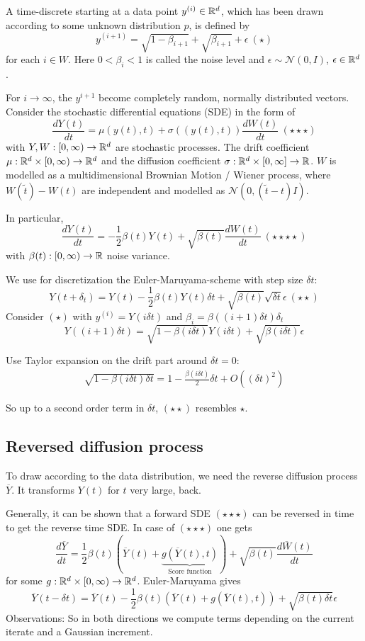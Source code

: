 \begin{definition}\label{def:.29}
    A time-discrete  starting at a data point $y^{(i)}\in\mathbb{R}^d$, which 
    has been drawn according to some unknown distribution $p$, is defined by 
    \[y^{(i+1)}=\sqrt{1-\beta_{i+1}}+\sqrt{\beta_{i+1}}+\epsilon\ (\star)\]
    for each $i\in W$. Here $0<\beta_i<1$ is called the noise level and $\epsilon\sim\mathcal{N}(0,I)$, $\epsilon\in\mathbb{R}^d$.
\end{definition}
For $i\to \infty$, the $y^{i+1}$ become completely random, normally distributed vectors. Consider the stochastic differential equations (SDE) in the 
form of 
\[\frac{d Y(t)}{dt}=\mu(y(t),t)+\sigma((y(t),t))\frac{dW(t)}{dt}\ (\star\star\star)\]
with $Y,W:[0,\infty)\to\mathbb{R}^d$ are stochastic processes. The drift coefficient $\mu:\mathbb{R}^d\times [0,\infty)\to\mathbb{R}^d$ and 
the diffusion coefficient $\sigma:\mathbb{R}^d\times [0,\infty]\to\mathbb{R}$. $W$ is modelled as a multidimensional Brownian Motion / Wiener process,
where $W(\tilde{t})-W(t)$ are independent and modelled as $\mathcal{N}(0,(\tilde{t}-t)I)$.

In particular, \[\frac{dY(t)}{dt}=-\frac{1}{2}\beta(t)Y(t)+\sqrt{\beta(t)}\frac{dW(t)}{dt}\ (\star\star\star\star)\]
with $\beta(t):[0,\infty)\to\mathbb{R}$ noise variance. 

We use for discretization the Euler-Maruyama-scheme with step size $\delta t$:
\[Y(t+\delta_t)=Y(t)-\frac{1}{2}\beta (t)Y(t)\delta t+\sqrt{\beta(t)}\sqrt{\delta t}\epsilon \ (\star\star)\]
Consider $(\star)$ with $y^{(i)}=Y(i\delta t)$ and $\beta_i=\beta((i+1)\delta t)\delta_t$
\[Y((i+1)\delta t)=\sqrt{1-\beta(i\delta t)}Y(i\delta t)+\sqrt{\beta(i\delta t)}\epsilon\]

Use Taylor expansion on the drift part around $\delta t=0$: 
\begin{align*}
    \sqrt{1-\beta(i\delta t)\delta t}=1-\frac{\beta(i\delta t)}{2}\delta t+ O((\delta t)^2)
\end{align*}

So up to a second order term in $\delta t$, $(\star\star)$ resembles $\star$.

\subsection{Reversed diffusion process}
To draw according to the data distribution, we need the reverse diffusion process $\overline{Y}$. It transforms $Y(t)$ for $t$ very large, back.

Generally, it can be shown that a forward SDE $(\star\star\star)$ can be reversed in time to get the reverse time SDE. In case of 
$(\star\star\star)$ one gets \[\frac{d\overline{Y}}{d t} = \frac{1}{2}\beta(t)(\overline{Y}(t)+\underbrace{g(\overline{Y}(t),t)}_{\text{Score function}})+\sqrt{\beta(t)}\frac{d\overline{W}(t)}{dt}\]
for some $g:\mathbb{R}^d\times [0,\infty)\to\mathbb{R}^d$. Euler-Maruyama gives 
\[\overline{Y}(t-\delta t)=\overline{Y}(t)-\frac{1}{2}\beta(t)(\overline{Y}(t)+g(\overline{Y}(t),t))+\sqrt{\beta(t)\delta t}\epsilon\]
Observations: So in both directions we compute terms depending on the current iterate and a Gaussian increment.

